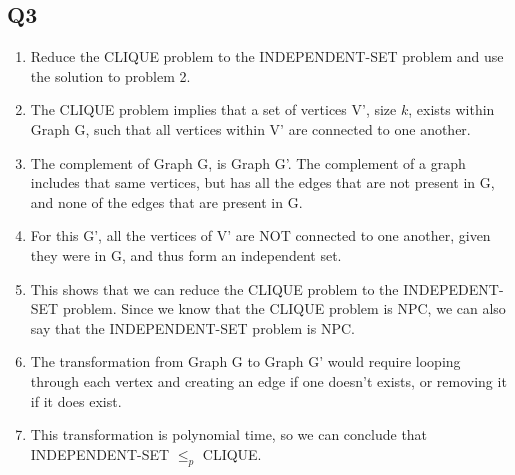 \documentclass{article}
\begin{document}
\subsection*{Q3}
\begin{enumerate}[label=(\alph*)]
    \item Reduce the CLIQUE problem to the INDEPENDENT-SET problem and use the solution to problem 2.
    \item The CLIQUE problem implies that a set of vertices V', size $k$, exists within Graph G, such that all vertices within V' are connected to one another. 
    \item The complement of Graph G, is Graph G'. The complement of a graph includes that same vertices, but has all the edges that are not present in G, and none of the edges that are present in G.
    \item For this G', all the vertices of V' are NOT connected to one another, given they were in G, and thus form an independent set.
    \item This shows that we can reduce the CLIQUE problem to the INDEPEDENT-SET problem. Since we know that the CLIQUE problem is NPC, we can also say that the INDEPENDENT-SET problem is NPC.
    \item The transformation from Graph G to Graph G' would require looping through each vertex and creating an edge if one doesn't exists, or removing it if it does exist.
    \item This transformation is polynomial time, so we can conclude that INDEPENDENT-SET $\leq_p$ CLIQUE.
\end{enumerate}

\end{document}
